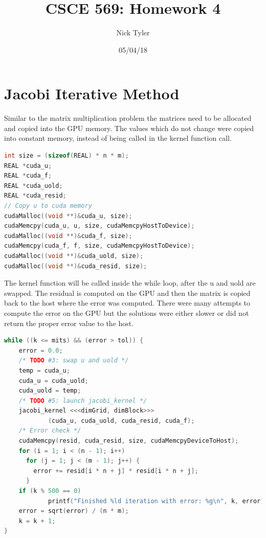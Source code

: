 \documentclass[a4paper]{article}
\title{CSCE 569: Homework 4}
\author{Nick Tyler}
\date{05/04/18}
\begin{document}
\maketitle

\section*{Jacobi Iterative Method}
Similar to the matrix multiplication problem the matrices need to be allocated and copied into the GPU memory. The values which do not change were copied into constant memory, instead of being called in the kernel function call.
\begin{lstlisting}[language=C++]
int size = (sizeof(REAL) * n * m);
REAL *cuda_u;
REAL *cuda_f;
REAL *cuda_uold;
REAL *cuda_resid;
// Copy u to cuda memory
cudaMalloc((void **)&cuda_u, size);
cudaMemcpy(cuda_u, u, size, cudaMemcpyHostToDevice);
cudaMalloc((void **)&cuda_f, size);
cudaMemcpy(cuda_f, f, size, cudaMemcpyHostToDevice);
cudaMalloc((void **)&cuda_uold, size);
cudaMalloc((void **)&cuda_resid, size);
\end{lstlisting}

The kernel function will be called inside the while loop, after the u and uold are swapped. The residual is computed on the GPU and then the matrix is copied back to the host where the error was computed. There were many attempts to compute the error on the GPU but the solutions were either slower or did not return the proper error value to the host.
\begin{lstlisting}[language=C++]
while ((k <= mits) && (error > tol)) {
	error = 0.0;
    /* TODO #3: swap u and uold */
    temp = cuda_u;
    cuda_u = cuda_uold;
    cuda_uold = temp;
    /* TODO #5: launch jacobi_kernel */
    jacobi_kernel <<<dimGrid, dimBlock>>> 
    		(cuda_u, cuda_uold, cuda_resid, cuda_f);
    /* Error check */
    cudaMemcpy(resid, cuda_resid, size, cudaMemcpyDeviceToHost);
    for (i = 1; i < (n - 1); i++)
      for (j = 1; j < (m - 1); j++) {
        error += resid[i * n + j] * resid[i * n + j];
      }
    if (k % 500 == 0) 
    		printf("Finished %ld iteration with error: %g\n", k, error);   		
	error = sqrt(error) / (n * m);
    k = k + 1;
}
\end{lstlisting}
\pagebreak
\end{document}
